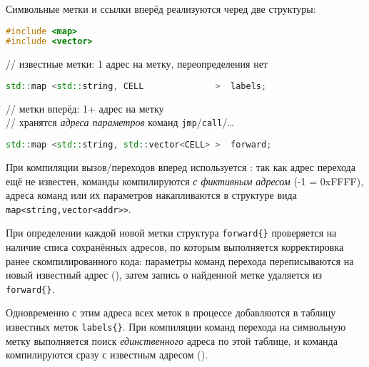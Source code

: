 \clearpage
{}

\noindent
Символьные метки и ссылки вперёд реализуются черед две структуры:
\begin{lstlisting}[language=C++,title=asm.cpp]
#include <map>
#include <vector>
\end{lstlisting}
// известные метки: 1 адрес на метку, переопределения нет
\begin{lstlisting}[language=C++]
std::map <std::string, CELL              >  labels;
\end{lstlisting}
// метки вперёд: 1+ адрес на метку\\
// хранятся \emph{адреса параметров} команд \verb|jmp|/\verb|call|/\ldots
\begin{lstlisting}[language=C++]
std::map <std::string, std::vector<CELL> >  forward;
\end{lstlisting}

\clearpage
При компиляции вызов/переходов вперед используется : так как
адрес перехода ещё не известен, команды компилируются \emph{с фиктивным адресом}
(-1 = 0xFFFF), адреса команд или их параметров накапливаются в структуре вида
\verb|map<string,vector<addr>>|.

При определении каждой новой метки структура \verb|forward{}| проверяется на
наличие списа сохранённых адресов, по которым выполняется корректировка ранее
скомпилированного кода: параметры команд перехода переписываются на новый
известный адрес (), затем запись о найденной метке удаляется
из \verb|forward{}|.

\smallskip
Одновременно с этим адреса всех меток в процессе 
добавляются в таблицу известных меток \verb|labels{}|. При компиляции команд
перехода на символьную метку выполняется поиск \emph{единственного} адреса по
этой таблице, и команда компилируются сразу с известным адресом ().

\clearpage
{}

